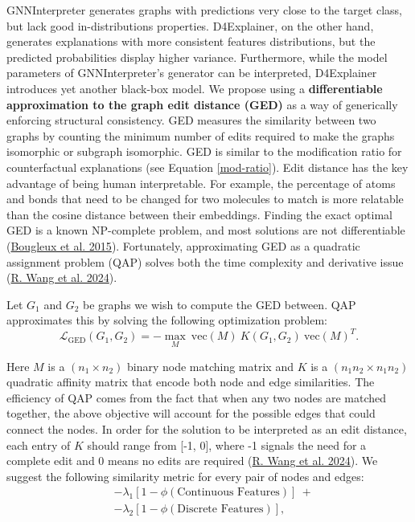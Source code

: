 \documentclass[
  11pt,
  letterpaper,
]{article}
\begin{document}
\quad GNNInterpreter generates graphs with predictions very close to the
target class, but lack good in-distributions properties. D4Explainer, on
the other hand, generates explanations with more consistent features
distributions, but the predicted probabilities display higher variance.
Furthermore, while the model parameters of GNNInterpreter's generator
can be interpreted, D4Explainer introduces yet another black-box model.
We propose using a \textbf{differentiable approximation to the graph
edit distance (GED)} as a way of generically enforcing structural
consistency. GED measures the similarity between two graphs by counting
the minimum number of edits required to make the graphs isomorphic or
subgraph isomorphic. GED is similar to the modification ratio for
counterfactual explanations (see Equation \ref{mod-ratio}). Edit
distance has the key advantage of being human interpretable. For
example, the percentage of atoms and bonds that need to be changed for
two molecules to match is more relatable than the cosine distance
between their embeddings. Finding the exact optimal GED is a known
NP-complete problem, and most solutions are not differentiable
(\protect\hyperlink{ref-Bougleux_Brun_Carletti_Foggia_Gauxfczuxe8re_Vento_2015}{Bougleux
et al. 2015}). Fortunately, approximating GED as a quadratic assignment
problem (QAP) solves both the time complexity and derivative issue
(\protect\hyperlink{ref-wang2024pygm}{R. Wang et al. 2024}).

\quad Let \(G_1\) and \(G_2\) be graphs we wish to compute the GED
between. QAP approximates this by solving the following optimization
problem: \begin{equation} \label{QAP-obj}
    \mathcal{L}_{\text{GED}}(G_1, G_2) = - \underset{M}{\max} \ \text{vec}(M) \ K(G_1, G_2) \ \text{vec}(M)^T.
\end{equation}

Here \(M\) is a \((n_1 \times n_2)\) binary node matching matrix and
\(K\) is a \((n_1 n_2 \times n_1 n_2)\) quadratic affinity matrix that
encode both node and edge similarities. The efficiency of QAP comes from
the fact that when any two nodes are matched together, the above
objective will account for the possible edges that could connect the
nodes. In order for the solution to be interpreted as an edit distance,
each entry of \(K\) should range from {[}-1, 0{]}, where -1 signals the
need for a complete edit and 0 means no edits are required
(\protect\hyperlink{ref-wang2024pygm}{R. Wang et al. 2024}). We suggest
the following similarity metric for every pair of nodes and edges:
\begin{equation}
    \begin{split}
         &-\lambda_1 \left[ 1 - \phi(\text{Continuous Features}) \right] \ + \\
         &-\lambda_2 \left[1 - \phi(\text{Discrete Features}) \right], 
    \end{split}
\end{equation}
\end{document}

